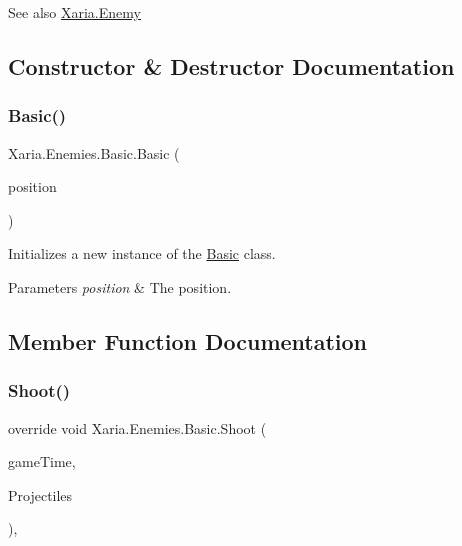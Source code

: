 \begin{DoxySeeAlso}{See also}
\hyperlink{classXaria_1_1Enemy}{Xaria.\+Enemy}


\end{DoxySeeAlso}


\subsection{Constructor \& Destructor Documentation}
\mbox{\label{classXaria_1_1Enemies_1_1Basic_abb1a1d9ed8e8b74741d054b8ee2dde07}} 
\subsubsection{\texorpdfstring{Basic()}{Basic()}}
{\footnotesize\ttfamily Xaria.\+Enemies.\+Basic.\+Basic (\begin{DoxyParamCaption}\item[{Vector2}]{position }\end{DoxyParamCaption})\hspace{0.3cm}{\ttfamily [inline]}}



Initializes a new instance of the \hyperlink{classXaria_1_1Enemies_1_1Basic}{Basic} class. 


\begin{DoxyParams}{Parameters}
{\em position} & The position.\\
\hline
\end{DoxyParams}


\subsection{Member Function Documentation}
\mbox{\label{classXaria_1_1Enemies_1_1Basic_a60c5523093585a2d52a9b587acf3bc28}} 
\subsubsection{\texorpdfstring{Shoot()}{Shoot()}}
{\footnotesize\ttfamily override void Xaria.\+Enemies.\+Basic.\+Shoot (\begin{DoxyParamCaption}\item[{Game\+Time}]{game\+Time,  }\item[{ref List$<$ \hyperlink{classXaria_1_1Projectile}{Projectile} $>$}]{Projectiles }\end{DoxyParamCaption})\hspace{0.3cm}{\ttfamily [inline]}, {\ttfamily [virtual]}}



